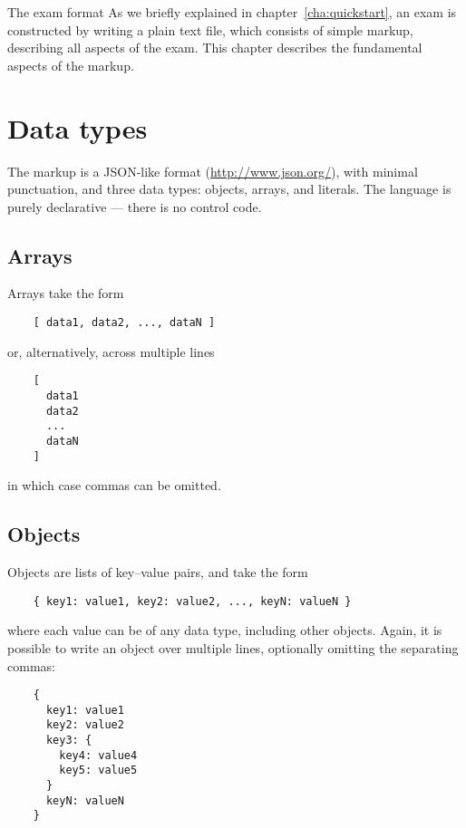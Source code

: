 %
%
%

\begin{chapter}{\label{cha:examformat}The exam format}
  As we briefly explained in chapter~\ref{cha:quickstart}, an exam is
  constructed by writing a plain text  file, which consists of
  simple markup, describing all aspects of the exam.  This chapter describes
  the fundamental aspects of the markup.

  \section{Data types}
  The markup is a JSON-like format (\url{http://www.json.org/}), with minimal
  punctuation, and three data types: objects, arrays, and literals. The
  language is purely declarative --- there is no control code.

  \subsection{Arrays}
  Arrays take the form
  \begin{Verbatim}
    [ data1, data2, ..., dataN ]
  \end{Verbatim}
  or, alternatively, across multiple lines
  \begin{Verbatim}
    [
      data1
      data2
      ...
      dataN
    ]
  \end{Verbatim}
  in which case commas can be omitted.

  \subsection{Objects}
  Objects are lists of key--value pairs, and take the form
  \begin{Verbatim}
    { key1: value1, key2: value2, ..., keyN: valueN }
  \end{Verbatim}
  where each value can be of any data type, including other objects.  Again, it
  is possible to write an object over multiple lines, optionally omitting the
  separating commas:
  \begin{Verbatim}
    {
      key1: value1
      key2: value2
      key3: {
        key4: value4
        key5: value5
      }
      keyN: valueN
    }
  \end{Verbatim}
  

\end{chapter}
